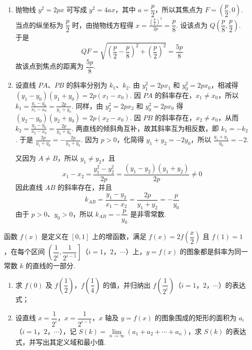 \begin{solution}
\begin{enumerate}
\item
抛物线 \(y^2=2px\) 可写成 \(y^2=4ax\)，其中 \(a=\dfrac p2\)，所以其焦点为
\(F=\left(\dfrac p2,0\right)\). 当点的纵坐标为 \(\dfrac p2\) 时，由抛物线方程得
\(x=\frac{(\frac{p}{2})^2}{2p}=\dfrac p8\).
设该点为 \(Q\left(\dfrac p8,\dfrac p2\right)\). 于是
\[
QF=\sqrt{\left(\dfrac p2-\dfrac p8\right)^2+\left(\dfrac p2\right)^2}=\dfrac{5p}{8}
\]
故该点到焦点的距离为 \(\dfrac{5p}{8}\).

\item
设直线 \(PA\)、\(PB\) 的斜率分别为 \(k_1\)、\(k_2\).
由 \(y_1^2=2px_1\) 和 \(y_0^2=2px_0\)，相减得
\((y_1-y_0)(y_1+y_0)=2p(x_1-x_0)\).
因 \(PA\) 的斜率存在，\(x_1\neq x_0\)，所以
\(k_1=\frac{y_1-y_0}{x_1-x_0}=\frac{2p}{y_1+y_0}\). 同样，由
\(y_2^2=2px_2\) 和 \(y_0^2=2px_0\) 得
\((y_2-y_0)(y_2+y_0)=2p(x_2-x_0)\).
因 \(PB\) 的斜率存在，\(x_2\neq x_0\)，从而
\(k_2=\frac{y_2-y_0}{x_2-x_0}=\frac{2p}{y_2+y_0}\).
两直线的倾斜角互补，故其斜率互为相反数，即 \(k_1=-k_2\). 于是
\(\frac{2p}{y_1+y_0}=-\frac{2p}{y_2+y_0}\).
因为 \(p>0\)，化简得 \(y_1+y_2=-2y_0\)，所以 \(\frac{y_1+y_2}{y_0}=-2\).

又因为 \(A\neq B\)，所以 \(y_1\neq y_2\)，且
\[
x_1-x_2=\frac{y_1^2-y_2^2}{2p}=\frac{(y_1-y_2)(y_1+y_2)}{2p}\neq0
\]
因此直线 \(AB\) 的斜率存在，并且
\[
k_{AB}=\frac{y_1-y_2}{x_1-x_2}=\frac{2p}{y_1+y_2}=-\frac p{y_0}
\]
由于 \(p>0\)、\(y_0>0\)，所以 \(k_{AB}=-\dfrac p{y_0}\) 是非零常数.
\end{enumerate}
\end{solution}

\begin{problem}
函数 \(f(x)\) 是定义在 \([0,1]\) 上的增函数，满足 \(f(x)=2f\left(\dfrac{x}{2}\right)\) 且 \(f(1)=1\)，在每个区间 \(\left(\dfrac{1}{2^i},\dfrac{1}{2^{i-1}}\right]\)（\(i=1\)，\(2\)，\(\cdots\)）上，\(y=f(x)\) 的图象都是斜率为同一常数 \(k\) 的直线的一部分.

\begin{enumerate}
\item 求 \(f(0)\) 及 \(f\left(\dfrac{1}{2}\right)\)，\(f\left(\dfrac{1}{4}\right)\) 的值，并归纳出 \(f\left(\dfrac{1}{2^i}\right)\)（\(i=1\)，\(2\)，\(\cdots\)）的表达式；
\item 设直线 \(x=\dfrac{1}{2^i}\)，\(x=\dfrac{1}{2^{i-1}}\)，\(x\) 轴及 \(y=f(x)\) 的图象围成的矩形的面积为 \(a_i\)（\(i=1\)，\(2\)，\(\cdots\)），记 \(S(k)=\lim\limits_{n\to\infty}(a_1+a_2+\cdots+a_n)\)，求 \(S(k)\) 的表达式，并写出其定义域和最小值.
\end{enumerate}
\end{problem}

